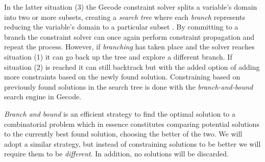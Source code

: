 In the latter situation (3) the Gecode constraint solver splits a variable's domain into
two or more subsets, creating a \textit{search tree} where each \textit{branch} represents
reducing the variable's domain to a particular subset \cite[Section~8]{MPG}. By committing
to a branch the constraint solver can once again perform constraint propagation and repeat
the process. However, if \textit{branching} has taken place and the solver reaches
situation (1) it can go back up the tree and explore a different branch. If situation (2)
is reached it can still backtrack but with the added option of adding more constraints
based on the newly found solution. Constraining based on previously found solutions in the
search tree is done with the \textit{branch-and-bound} search engine\cite[Section~9]{MPG}
in Gecode.

\textit{Branch and bound} is an efficient strategy to find the optimal solution to a
combinatorial problem which in essence constitutes comparing potential solutions to the
currently best found solution, choosing the better of the two\cite{BaB}. We will adopt a
similar strategy, but instead of constraining solutions to be better we will require them
to be \textit{different}. In addition, no solutions will be discarded.
